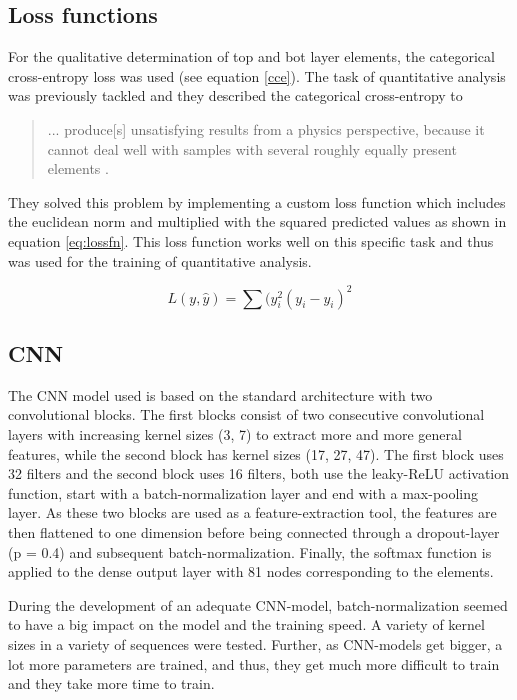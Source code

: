 \subsection{Loss functions}
For the qualitative determination of top and bot layer elements, the categorical cross-entropy loss was used (see equation \ref{cce}).
The task of quantitative analysis was previously tackled and they described the categorical cross-entropy to \begin{quote}
    ... produce[s] unsatisfying results from a physics perspective, because it cannot deal well
with samples with several roughly equally present elements \cite{drera_deep_2019}.
\end{quote}
They solved this problem by implementing a custom loss function which includes the euclidean norm and multiplied with the squared predicted values as shown in equation \ref{eq:lossfn}. This loss function works well on this specific task and thus was used for the training of quantitative analysis.

\begin{equation}
\label{eq:lossfn}
    L(y, \hat{y}) = \sum(y_{i}^2 (y_{i} - \hat{y_{i}})^2
\end{equation}




\subsection{CNN}
The CNN model used is based on the standard architecture with two convolutional blocks. The first blocks consist of two consecutive convolutional layers with increasing kernel sizes (3, 7) to extract more and more general features, while the second block has kernel sizes (17, 27, 47). The first block uses 32 filters and the second block uses 16 filters, both use the leaky-ReLU activation function, start with a batch-normalization layer and end with a max-pooling layer.
As these two blocks are used as a feature-extraction tool, the features are then flattened to one dimension before being connected through a dropout-layer (p = 0.4) and subsequent batch-normalization. Finally, the softmax function is applied to the dense output layer with 81 nodes corresponding to the elements.

During the development of an adequate CNN-model, batch-normalization seemed to have a big impact on the model and the training speed. A variety of kernel sizes in a variety of sequences were tested. Further, as CNN-models get bigger, a lot more parameters are trained, and thus, they get much more difficult to train and they take more time to train.


